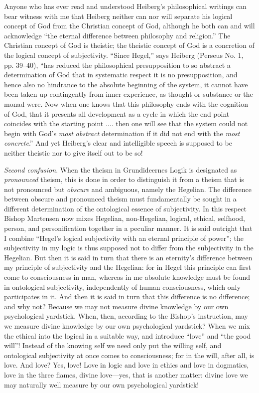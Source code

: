 \documentclass[12pt]{book}
\newcommand{\opage}[1]{\marginnote{\footnotesize\textit{[#1]}}}
\begin{document}
Anyone who has ever read and understood Heiberg's philosophical writings can bear witness with me that Heiberg neither can nor will separate his logical concept of God from the Christian concept of God, although he both can and will acknowledge ``the eternal difference between philosophy and religion.'' The Christian concept of God is theistic; the theistic concept of God is a concretion of the logical concept of subjectivity. ``Since Hegel,'' says Heiberg (Perseus No. 1, pp. 39--40), ``has reduced the philosophical presupposition to so abstract a determination of God that in systematic respect it is no presupposition, and hence also no hindrance to the absolute beginning of the system, it cannot have been taken up contingently from inner experience, as thought or substance or the monad were. Now when one knows that this philosophy ends with the cognition of God, that it presents all development as a cycle in which the end point coincides with the starting point .... then one will see that the system could not begin with God's \emph{most abstract} determination if it did not end with the \emph{most concrete}.'' And yet Heiberg's clear and intelligible speech is supposed to be neither theistic nor to give itself out to be so!

\emph{Second confusion}. When the theism in Grundideernes Logik is designated as \emph{pronounced} theism, this is done in order to distinguish it from a theism that is not pronounced but \emph{obscure}
\opage{123}\setcounter{footnote}{0}%
and ambiguous, namely the Hegelian. The difference between obscure and pronounced theism must fundamentally be sought in a different determination of the ontological essence of subjectivity. In this respect Bishop Martensen now mixes Hegelian, non-Hegelian, logical, ethical, selfhood, person, and personification together in a peculiar manner. It is said outright that I combine ``Hegel's logical subjectivity with an eternal principle of power''; the subjectivity in my logic is thus supposed not to differ from the subjectivity in the Hegelian. But then it is said in turn that there is an eternity's difference between my principle of subjectivity and the Hegelian: for in Hegel this principle can first come to consciousness in man, whereas in me absolute knowledge must be found in ontological subjectivity, independently of human consciousness, which only participates in it. And then it is said in turn that this difference is no difference; and why not? Because we may not measure divine knowledge by our own psychological yardstick. When, then, according to the Bishop's instruction, may we measure divine knowledge by our own psychological yardstick? When we mix the ethical into the logical in a suitable way, and introduce ``love'' and ``the good will''! Instead of the knowing self we need only put the willing self, and ontological subjectivity at once comes to consciousness; for in the will, after all, is love. And love? Yes, love! Love in logic and love in ethics and love in dogmatics, love in the three flames, divine love---yes, that is another matter: divine love we may naturally well measure by our own psychological yardstick!
\end{document}
